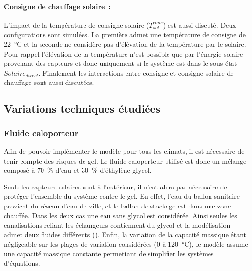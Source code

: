 \paragraph{Consigne de chauffage solaire~:} %
\label{par:consigne_de_chauffage_solaire}
L’impact de la température de consigne solaire ($T^{cons}_{sol}$) est aussi discuté. Deux
configurations sont simulées. La première admet une température de consigne de
\SI{22}{\celsius} et la seconde ne considère pas d’élévation de la température par le
solaire. Pour rappel l’élévation de la température n’est possible que par l’énergie
solaire provenant des capteurs et donc uniquement si le système est dans le sous-état
$Solaire_{direct}$. Finalement les interactions entre consigne et consigne solaire de
chauffage sont aussi discutées.


\subsection{Variations techniques étudiées} %
\label{sub:variations_techniques_etudiees}
\subsubsection{Fluide caloporteur} %
\label{ssub:fluide_caloporteur}
Afin de pouvoir implémenter le modèle pour tous les climats, il est nécessaire de
tenir compte des risques de gel. Le fluide caloporteur utilisé est donc un
mélange composé à \SI{70}{\percent} d’eau et \SI{30}{\percent} d’éthylène-glycol.

Seuls les capteurs solaires sont à l’extérieur, il n’est alors pas nécessaire de protéger
l’ensemble du système contre le gel. En effet, l’eau du ballon sanitaire provient du
réseau d’eau de ville, et le ballon de stockage est dans une zone chauffée. Dans les
deux cas une eau sans glycol est considérée. Ainsi seules les canalisations reliant les
échangeurs contiennent du glycol et la modélisation admet deux fluides différents
(). Enfin, la variation de la capacité massique étant négligeable sur
les plages de variation considérées (\num{0} à \SI{120}{\celsius}), le modèle assume une
capacité massique constante permettant de simplifier les systèmes d’équations.

